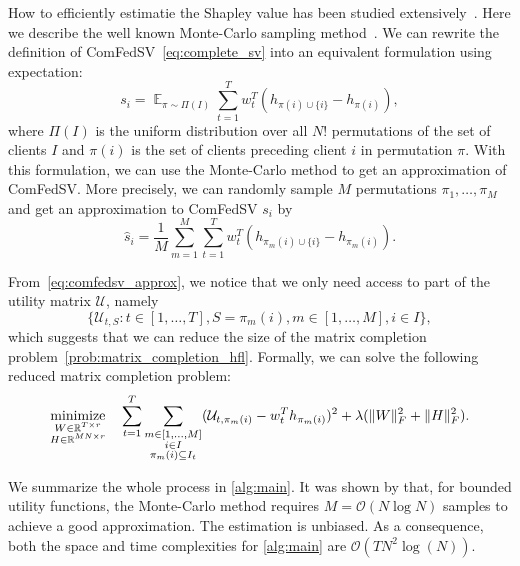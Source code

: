 How to efficiently estimatie the Shapley value has been studied extensively~\cite{ghorbani2019data,jia2019towards}. Here we describe the well known Monte-Carlo sampling method~\cite{metropolis1949monte, ghorbani2019data}. We can rewrite the definition of ComFedSV~\eqref{eq:complete_sv} into an equivalent formulation using expectation:
\begin{equation} 
    s_i = \mathop{\mathbb{E}}_{\pi \sim \Pi(I)} \sum_{t=1}^T w_t^T\left(h_{ \pi(i) \cup \{i\}}  - h_{ \pi(i) }\right),
\end{equation}
where $\Pi(I)$ is the uniform distribution over all $N!$ permutations of the set of clients $I$ and $\pi(i)$ is the set of clients preceding client $i$ in permutation $\pi$. With this formulation, we can use the Monte-Carlo method to get an approximation of ComFedSV. More precisely, we can randomly sample $M$ permutations $\pi_1, \dots, \pi_M$ and get an approximation to ComFedSV $s_i$ by 
\begin{equation} \label{eq:comfedsv_approx}
    \hat s_i = \frac{1}{M}\sum_{m=1}^M \sum_{t=1}^T w_t^T\left(h_{ \pi_m(i) \cup \{i\}}  - h_{ \pi_m(i) }\right).
\end{equation}

From~\eqref{eq:comfedsv_approx}, we notice that we only need access to part of the utility matrix $\mathcal{U}$, namely 
\[ \{\mathcal{U}_{t, S}: t \in [1, \dots, T], S = \pi_m(i), m \in [1,\dots,M], i \in I\}, \]
which suggests that we can reduce the size of the matrix completion problem~\eqref{prob:matrix_completion_hfl}. Formally, we can solve the following reduced matrix completion problem:
\begin{equation}
\label{prob:matrix_completion_reduced}
\displaystyle\mathop{\hbox{\rm minimize}}_{\substack{W \in \mathbb{R}^{T \times r}\\ H \in \mathbb{R}^{MN \times r}}}\enspace\enspace \sum_{t=1}^T\sum_{ \substack{m \in [1,\dots, M] \\ i \in I \\ \pi_m(i) \subseteq I_t  } } (\mathcal{U}_{t,\pi_m(i)} - w_t^Th_{\pi_m(i)})^2 + \lambda(\|W\|_F^2 + \|H\|_F^2).
\end{equation}

We summarize the whole process in \autoref{alg:main}. It was shown by \cite{maleki2013bounding} that, for bounded utility functions, the Monte-Carlo method requires $M = \mathcal{O}(N\log N)$ samples to achieve a good approximation.  The estimation is unbiased. As a consequence, both the space and time complexities for \autoref{alg:main} are $\mathcal{O}(TN^2\log(N))$. 

